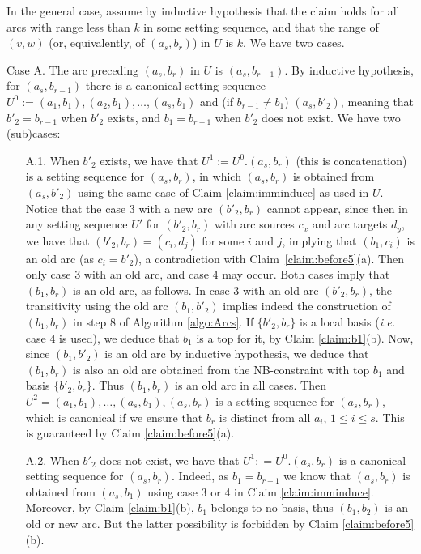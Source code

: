 \documentclass{article}
\begin{document}
In the general case, assume by inductive hypothesis that the claim holds for all
arcs with range less than $k$ in some setting sequence, and that the range of  $(v,w)$
(or, equivalently, of $(a_s,b_r)$) in $U$ is $k$.  We have two cases.

Case A. The arc preceding $(a_s,b_r)$ in $U$ is $(a_s,b_{r-1})$. By inductive hypothesis, for
$(a_s,b_{r-1})$ there is a canonical setting sequence $U^0:=(a_1,b_1), (a_2,b_1), \ldots ,(a_s,b_1)$ and 
(if $b_{r-1}\neq b_1$) $(a_s,b'_2)$, meaning that $b'_2=b_{r-1}$ when $b'_2$
exists, and $b_1=b_{r-1}$ when $b'_2$ does not exist. We have two (sub)cases:

\begin{enumerate} 
\item[A.1.]  When $b'_2$ exists, we have that $U^1:=U^0.(a_s,b_r)$ 
(this is concatenation)
is a setting sequence for $(a_s,b_r)$, in which  $(a_s,b_r)$ is obtained from $(a_s, b'_2)$ 
using the
same case of Claim \ref{claim:imminduce} as used in $U$. Notice that the case 3 with a new
arc $(b'_2, b_r)$ cannot appear, since then in any setting sequence $U'$ for 
$(b'_2, b_r)$ with arc sources $c_x$ and arc targets $d_y$, we have that 
$(b'_2, b_r)=(c_i, d_j)$ for some $i$ and $j$, implying that $(b_1, c_i)$ is an
old arc (as $c_i=b'_2$), a contradiction with Claim~\ref{claim:before5}(a). Then
only case 3 with an old arc, and case 4 may occur. Both cases imply that $(b_1,b_r)$
is an old arc, as follows. In case 3 with an old arc $(b'_2,b_r)$, the transitivity
using the old arc $(b_1, b'_2)$ implies indeed the construction of $(b_1,b_r)$
in step 8 of Algorithm \ref{algo:Arcs}. If $\{b'_{2},b_r\}$ is a
local basis ({\em i.e.} case 4 is used), we deduce that $b_1$ is a top for it, by
Claim \ref{claim:b1}(b). Now, since $(b_1,b'_2)$ is an old arc by inductive hypothesis,
we deduce that $(b_1,b_r)$ is also an old arc obtained from the NB-constraint with top
$b_1$ and basis  $\{b'_{2},b_r\}$. Thus $(b_1,b_r)$ is an old arc in all cases. Then
$U^2=(a_1,b_1), \ldots, (a_s,b_1), (a_s,b_r)$ is a setting sequence for $(a_s,b_r)$,
which is canonical if we ensure that $b_r$ is distinct from all $a_i$, $1\leq i\leq s$.
This is guaranteed by Claim \ref{claim:before5}(a).
\item[A.2.] When $b'_2$ does not exist, we have that $U^1: =U^0.(a_s,b_r)$ is
a canonical setting sequence for $(a_s,b_r)$. Indeed, as $b_1=b_{r-1}$ we know that
$(a_s,b_r)$ is obtained from $(a_s, b_1)$ using case 3 or 4 in Claim 
\ref{claim:imminduce}. Moreover, by Claim \ref{claim:b1}(b), $b_1$ belongs to no basis, 
thus $(b_1,b_2)$ is an old or new arc. But the latter possibility is forbidden by 
Claim \ref{claim:before5}(b).
\end{enumerate}
\end{document}
